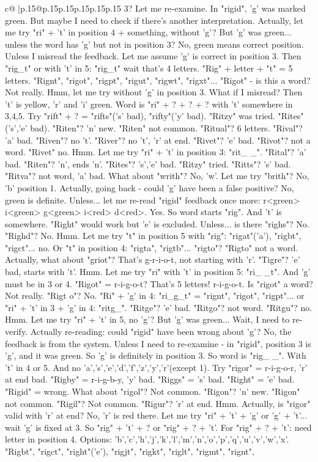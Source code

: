 \documentclass{article}
\begin{document}
{\begin{supertabular}{c@{$\;$}|p{.15\linewidth}@{}p{.15\linewidth}p{.15\linewidth}p{.15\linewidth}p{.15\linewidth}p{.15\linewidth}}
{{{3? Let me re{-}examine. In "rigid", 'g' was marked green. But maybe I need to check if there's another interpretation. Actually, let me try "ri" + 't' in position 4 + something, without 'g'? But 'g' was green... unless the word has 'g' but not in position 3? No, green means correct position. Unless I misread the feedback. Let me assume 'g' is correct in position 3. Then "rig\_t" or with 't' in 5: "rig\_t" wait that's 4 letters. "Rig" + letter + "t" = 5 letters. "Rignt", "rigot", "rigpt", "rigut", "rigwt", "rigxt"... "Rigot" {-} is this a word? Not really. Hmm, let me try without 'g' in position 3. What if I misread? Then 't' is yellow, 'r' and 'i' green. Word is "ri" + ? + ? + ? with 't' somewhere in 3,4,5. Try "rift" + ? = "rifts"('s' bad), "rifty"('y' bad). "Ritzy" was tried. "Rites"('s','e' bad). "Riten"? 'n' new. "Riten" not common. "Ritual"? 6 letters. "Rival"? 'a' bad. "Riven"? no 't'. "River"? no 't', 'r' at end. "Rivet"? 'e' bad. "Rivot"? not a word. "Rivet" no. Hmm. Let me try "ri" + 't' in position 3: "rit\_ \_". "Rital"? 'a' bad. "Riten"? 'n', ends 'n'. "Rites"? 's','e' bad. "Ritzy" tried. "Ritts"? 's' bad. "Ritva"? not word, 'a' bad. What about "writh"? No, 'w'. Let me try "brith"? No, 'b' position 1. Actually, going back {-} could 'g' have been a false positive? No, green is definite. Unless... let me re{-}read "rigid" feedback once more: r<green> i<green> g<green> i<red> d<red>. Yes. So word starts "rig". And 't' is somewhere. "Right" would work but 'e' is excluded. Unless... is there "righs"? No. "Righd"? No. Hmm. Let me try "t" in position 5 with "rig": "rigat"('a'), "rigbt", "rigct"... no. Or "t" in position 4: "rigta", "rigtb"... "rigto"? "Rigto" not a word. Actually, what about "griot"? That's g{-}r{-}i{-}o{-}t, not starting with 'r'. "Tigre"? 'e' bad, starts with 't'. Hmm. Let me try "ri" with 't' in position 5: "ri\_ \_t". And 'g' must be in 3 or 4. "Rigot" = r{-}i{-}g{-}o{-}t? That's 5 letters! r{-}i{-}g{-}o{-}t. Is "rigot" a word? Not really. "Rigt o"? No. "Ri" + 'g' in 4: "ri\_g\_t" = "rignt", "rigot", "rigpt"... or "ri" + 't' in 3 + 'g' in 4: "ritg\_". "Ritge"? 'e' bad. "Ritgo"? not word. "Ritgu"? no. Hmm. Let me try "ri" + 't' in 5, no 'g'? But 'g' was green... Wait, I need to re{-}verify. Actually re{-}reading: could "rigid" have been wrong about 'g'? No, the feedback is from the system. Unless I need to re{-}examine {-} in "rigid", position 3 is 'g', and it was green. So 'g' is definitely in position 3. So word is "rig\_ \_". With 't' in 4 or 5. And no 'a','s','e','d','f','z','y','r'(except 1). Try "rigor" = r{-}i{-}g{-}o{-}r, 'r' at end bad. "Rigby" = r{-}i{-}g{-}b{-}y, 'y' bad. "Riggs" = 's' bad. "Right" = 'e' bad. "Rigid" = wrong. What about "rigol"? Not common. "Rigon"? 'n' new. "Rigon" not common. "Rigil"? Not common. "Rigur"? 'r' at end. Hmm. Actually, is "rigor" valid with 'r' at end? No, 'r' is red there. Let me try "ri" + 't' + 'g' or 'g' + 't'... wait 'g' is fixed at 3. So "rig" + 't' + ? or "rig" + ? + 't'. For "rig" + ? + 't': need letter in position 4. Options: 'b','c','h','j','k','l','m','n','o','p','q','u','v','w','x'. "Rigbt", "rigct", "right"('e'), "rigjt", "rigkt", "riglt", "rigmt", "rignt", }}}
\end{supertabular}}
\end{document}
